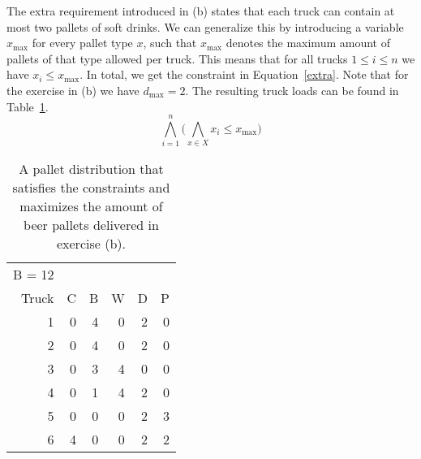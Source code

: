 The extra requirement introduced in (b) states that each truck can contain at most two pallets of soft drinks. We can generalize this by introducing a variable $x_{\max}$ for every pallet type $x$, such that $x_{\max}$ denotes the maximum amount of pallets of that type allowed per truck. This means that for all trucks $1 \leq i \leq n$ we have $x_i \leq x_{\max}$. In total, we get the constraint in Equation~\ref{extra}. Note that for the exercise in (b) we have $d_{\max} = 2$. The resulting truck loads can be found in Table~\ref{tab:b_table}.
\begin{equation}
    \label{extra}
    \bigwedge^n_{i=1}\bigg( \bigwedge_{x \in X} x_i \leq x_{\max}\bigg)
\end{equation}

\begin{table}[!ht]
  \begin{tabular}{r | r r r r r}
    B = 12\\
    Truck &  C &  B &  W &  D &  P\\\hline
        1 &  0 &  4 &  0 &  2 &  0\\
        2 &  0 &  4 &  0 &  2 &  0\\
        3 &  0 &  3 &  4 &  0 &  0\\
        4 &  0 &  1 &  4 &  2 &  0\\
        5 &  0 &  0 &  0 &  2 &  3\\
        6 &  4 &  0 &  0 &  2 &  2\\
  \end{tabular}
  \caption{A pallet distribution that satisfies the constraints and maximizes the amount of beer pallets delivered in exercise (b).}
  \label{tab:b_table}
\end{table}


